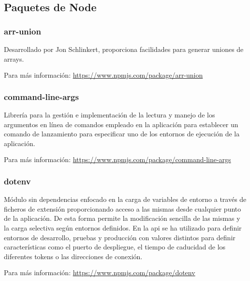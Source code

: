 \subsection{Paquetes de Node}

\subsubsection{arr-union}
\label{lib:api:arr_union}

Desarrollado por Jon Schlinkert, proporciona facilidades para generar uniones de arrays.

Para más información: \href{https://www.npmjs.com/package/arr-union}{https://www.npmjs.com/package/arr-union}

\subsubsection{command-line-args}
\label{lib:api:command_line_args}

Librería para la gestión e implementación de la lectura y manejo de los argumentos en línea de comandos empleado en la aplicación para establecer un comando de lanzamiento para especificar uno de los entornos de ejecución de la aplicación.

Para más información: \href{https://www.npmjs.com/package/command-line-args}{https://www.npmjs.com/package/command-line-args}

\subsubsection{dotenv}
\label{lib:api:dotenv}

Módulo sin dependencias enfocado en la carga de variables de entorno a través de ficheros de extensión  proporcionando acceso a las mismas desde cualquier punto de la aplicación. De esta forma permite la modificación sencilla de las mismas y la carga selectiva según entornos definidos. En la \acrshort{api} se ha utilizado para definir entornos de desarrollo, pruebas y producción con valores distintos para definir características como el puerto de despliegue, el tiempo de caducidad de los diferentes \glspl{token} o las direcciones de conexión.

Para más información: \href{https://www.npmjs.com/package/dotenv}{https://www.npmjs.com/package/dotenv}

